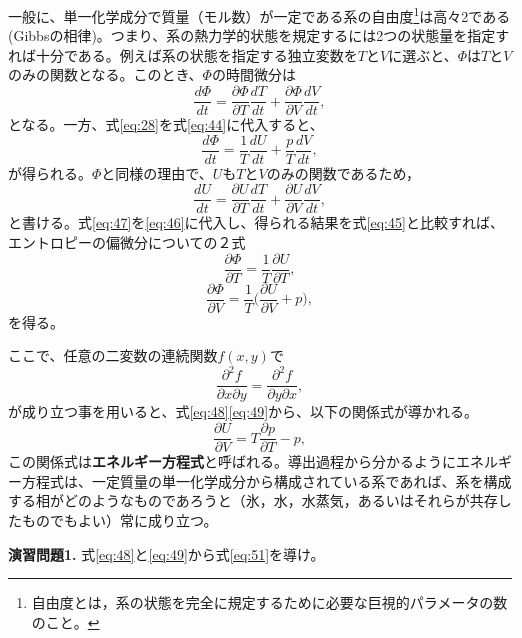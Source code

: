 \documentclass{ltjsarticle}
\begin{document}
一般に、単一化学成分で質量（モル数）が一定である系の自由度\footnote{自由度とは，系の状態を完全に規定するために必要な巨視的パラメータの数のこと。}は高々2である(Gibbsの相律)。つまり、系の熱力学的状態を規定するには2つの状態量を指定すれば十分である。例えば系の状態を指定する独立変数を$T$と$V$に選ぶと、$\Phi$は$T$と$V$のみの関数となる。このとき、$\Phi$の時間微分は
\begin{equation}\label{eq:45}
 \frac{d\Phi}{dt}=\frac{\partial \Phi}{\partial T}\frac{dT}{dt}+\frac{\partial \Phi}{\partial V}\frac{dV}{dt},
\end{equation}
となる。一方、式\eqref{eq:28}を式\eqref{eq:44}に代入すると、
\begin{equation}\label{eq:46}
 \frac{d\Phi}{dt}=\frac{1}{T}\frac{dU}{dt}+\frac{p}{T}\frac{dV}{dt},
\end{equation}
が得られる。$\Phi$と同様の理由で、$U$も$T$と$V$のみの関数であるため，
\begin{equation}\label{eq:47}
 \frac{dU}{dt}=\frac{\partial U}{\partial T}\frac{dT}{dt}+\frac{\partial U}{\partial V}\frac{dV}{dt},
\end{equation}
と書ける。式\eqref{eq:47}を\eqref{eq:46}に代入し、得られる結果を式\eqref{eq:45}と比較すれば、エントロピーの偏微分についての２式
\begin{equation}\label{eq:48}
 \frac{\partial \Phi}{\partial T}=\frac{1}{T}\frac{\partial U}{\partial T},
\end{equation}
\begin{equation}\label{eq:49}
 \frac{\partial \Phi}{\partial V}=\frac{1}{T}{\bigg (}\frac{\partial U}{\partial V}+p{\bigg )},
\end{equation}
を得る。

ここで、任意の二変数の連続関数$f(x,y)$で
\begin{equation}\label{eq:50}
 \frac{\partial^{2} f}{\partial x \partial y}=\frac{\partial^{2} f}{\partial y \partial x},
\end{equation}
が成り立つ事を用いると、式\eqref{eq:48}\eqref{eq:49}から、以下の関係式が導かれる。
\begin{equation}\label{eq:51}
 \frac{\partial U}{\partial V}=T\frac{\partial p}{\partial T}-p,
\end{equation}
この関係式は{\bf エネルギー方程式}と呼ばれる。導出過程から分かるようにエネルギー方程式は、一定質量の単一化学成分から構成されている系であれば、系を構成する相がどのようなものであろうと（氷，水，水蒸気，あるいはそれらが共存したものでもよい）常に成り立つ。
\\
\begin{itembox}[l]{\bf{演習問題1.}}
式\eqref{eq:48}と\eqref{eq:49}から式\eqref{eq:51}を導け。
\end{itembox}
\end{document}
